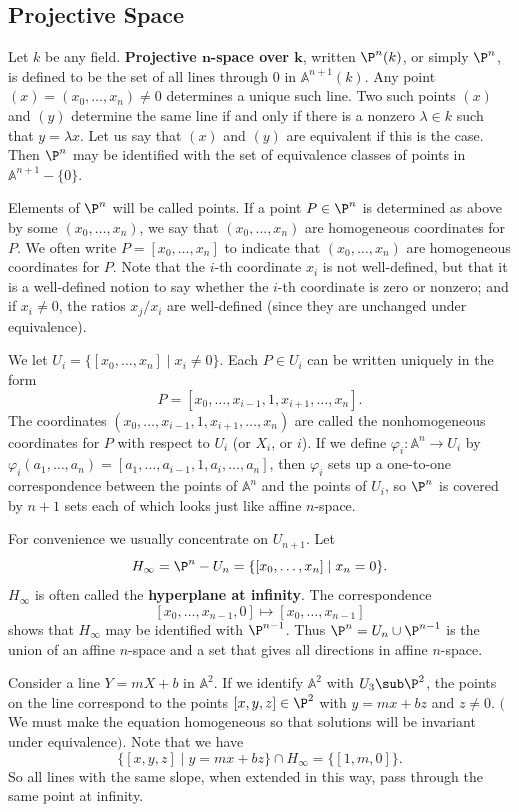 \subsection{Projective Space}
Let $k$ be any field. \textbf{Projective $\bm{n}$-space over $\bm{k}$}, written $\P^n(k)$, or simply $\P^n$, is defined to be the set of all lines through $0$ in $\mathbb{A}^{n+1}(k)$. Any point $(x)=(x_0,\dots,x_n)\neq 0$ determines a unique such line. Two such points $(x)$ and $(y)$ determine the same line if and only if there is a nonzero $\lambda\in k$ such that $y=\lambda x$. Let us say that $(x)$ and $(y)$ are equivalent if this is the case. Then $\P^n$ may be identified with the set of equivalence classes of points in $\mathbb{A}^{n+1}-\{0\}$.\par
Elements of $\P^n$ will be called points. If a point $P\in\P^n$ is determined as above by some $(x_0,\dots,x_n)$, we say that $(x_0,\dots,x_n)$ are homogeneous coordinates for $P$. We often write $P=[x_0,\dots,x_n]$ to indicate that $(x_0,\dots,x_n)$ are homogeneous coordinates for $P$. Note that the $i$-th coordinate $x_i$ is not well-defined, but that it is a well-defined notion to say whether the $i$-th coordinate is zero or nonzero; and if $x_i\neq 0$, the ratios $x_j/x_i$ are well-defined (since they are unchanged under equivalence).\par
We let $U_i=\{[x_0,\dots,x_n]\mid x_i\neq0\}$. Each $P\in U_i$ can be written uniquely in the form
\[P=[x_0,\dots,x_{i-1},1,x_{i+1},\dots,x_{n}].\]
The coordinates $(x_0,\dots,x_{i-1},1,x_{i+1},\dots,x_{n})$ are called the nonhomogeneous coordinates for $P$ with respect to $U_i$ (or $X_i$, or $i$). If we define $\varphi_i:\mathbb{A}^n\to U_i$ by $\varphi_i(a_1,\dots,a_n)=[a_1,\dots,a_{i-1},1,a_i,\dots,a_n]$, then $\varphi_i$ sets up a one-to-one correspondence between the points of $\mathbb{A}^n$ and the points of $U_i$, so $\P^n$ is covered by $n+1$ sets each of which looks just like affine $n$-space.\par
For convenience we usually concentrate on $U_{n+1}$. Let
\[H_{\infty}=\P^n-U_{n}=\{[x_0,\dots,x_n]\mid x_{n}=0\}.\]
$H_\infty$ is often called the \textbf{hyperplane at infinity}. The correspondence 
\[[x_0,\dots,x_{n-1},0]\mapsto[x_0,\dots,x_{n-1}]\]
shows that $H_\infty$ may be identified with $\P^{n-1}$. Thus $\P^n=U_{n}\cup\P^{n-1}$ is the union of an affine $n$-space and a set that gives all directions in affine $n$-space.
\begin{example}
Consider a line $Y=mX+b$ in $\mathbb{A}^2$. If we identify $\mathbb{A}^2$ with $U_3\sub\P^2$, the points on the line correspond to the points $[x,y,z]\in\P^2$ with $y=mx+bz$ and $z\neq0$. $($We must make the equation homogeneous so that solutions will be invariant under
equivalence$)$. Note that we have 
\[\{[x,y,z]\mid y=mx+bz\}\cap H_\infty=\{[1,m,0]\}.\] 
So all lines with the same slope, when extended in this way, pass through the same point at infinity.
\end{example}
